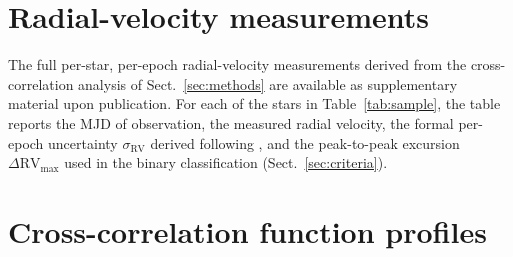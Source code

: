 \begin{appendix}

\section{Radial-velocity measurements}
\label{app:rv_tables}

The full per-star, per-epoch radial-velocity measurements derived from the
\primaryline cross-correlation analysis of Sect.~\ref{sec:methods} are
available as supplementary material upon publication. For each of the
\Ntotal stars in Table~\ref{tab:sample}, the table reports the MJD of
observation, the measured radial velocity, the formal per-epoch
uncertainty $\sigma_\mathrm{RV}$ derived following \citet{Zucker2003},
and the peak-to-peak excursion
$\Delta\mathrm{RV}_\mathrm{max}$ used in the binary classification
(Sect.~\ref{sec:criteria}).

\section{Cross-correlation function profiles}
\label{app:ccf_plots}

\end{appendix}
